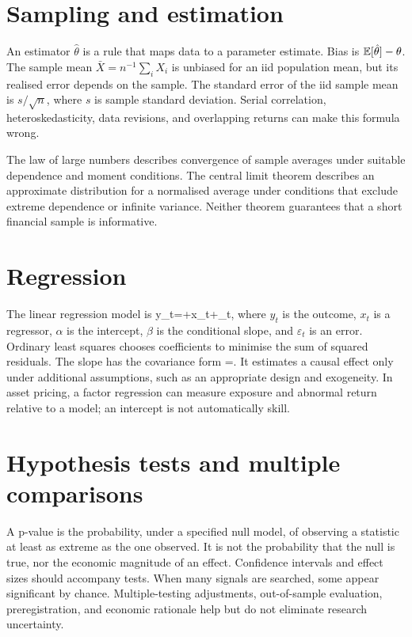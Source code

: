 \section{Sampling and estimation}
An estimator $\hat\theta$ is a rule that maps data to a parameter estimate. Bias is $\mathbb{E}[\hat\theta]-\theta$. The sample mean $\bar X=n^{-1}\sum_iX_i$ is unbiased for an iid population mean, but its realised error depends on the sample. The standard error of the iid sample mean is $s/\sqrt n$, where $s$ is sample standard deviation. Serial correlation, heteroskedasticity, data revisions, and overlapping returns can make this formula wrong.

The law of large numbers describes convergence of sample averages under suitable dependence and moment conditions. The central limit theorem describes an approximate distribution for a normalised average under conditions that exclude extreme dependence or infinite variance. Neither theorem guarantees that a short financial sample is informative.

\section{Regression}
The linear regression model is
  y_t=\alpha+\beta x_t+\varepsilon_t,
\closeformula
where $y_t$ is the outcome, $x_t$ is a regressor, $\alpha$ is the intercept, $\beta$ is the conditional slope, and $\varepsilon_t$ is an error. Ordinary least squares chooses coefficients to minimise the sum of squared residuals. The slope has the covariance form
  \hat\beta=.
\closeformula
It estimates a causal effect only under additional assumptions, such as an appropriate design and exogeneity. In asset pricing, a factor regression can measure exposure and abnormal return relative to a model; an intercept is not automatically skill.

\section{Hypothesis tests and multiple comparisons}
A p-value is the probability, under a specified null model, of observing a statistic at least as extreme as the one observed. It is not the probability that the null is true, nor the economic magnitude of an effect. Confidence intervals and effect sizes should accompany tests. When many signals are searched, some appear significant by chance. Multiple-testing adjustments, out-of-sample evaluation, preregistration, and economic rationale help but do not eliminate research uncertainty.

